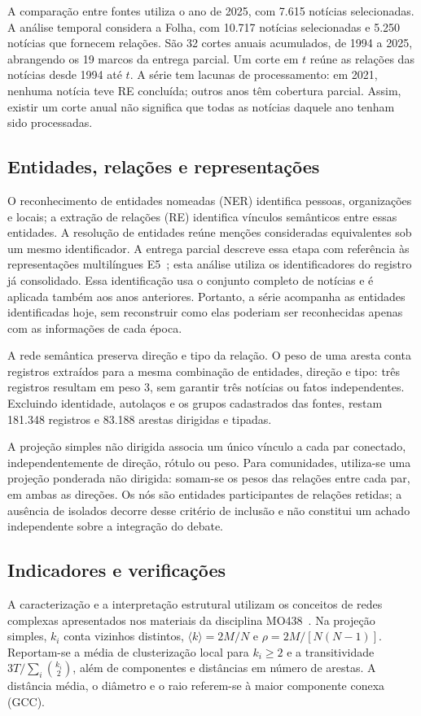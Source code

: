 \documentclass[11pt,a4paper]{article}
\begin{document}
A comparação entre fontes utiliza o ano de 2025, com 7.615 notícias selecionadas. A análise temporal considera a Folha, com 10.717 notícias selecionadas e 5.250 notícias que fornecem relações. São 32 cortes anuais acumulados, de 1994 a 2025, abrangendo os 19 marcos da entrega parcial. Um corte em $t$ reúne as relações das notícias desde 1994 até $t$. A série tem lacunas de processamento: em 2021, nenhuma notícia teve RE concluída; outros anos têm cobertura parcial. Assim, existir um corte anual não significa que todas as notícias daquele ano tenham sido processadas.

\subsection{Entidades, relações e representações}
O reconhecimento de entidades nomeadas (NER) identifica pessoas, organizações e locais; a extração de relações (RE) identifica vínculos semânticos entre essas entidades. A resolução de entidades reúne menções consideradas equivalentes sob um mesmo identificador. A entrega parcial descreve essa etapa com referência às representações multilíngues E5~\cite{wang2024e5}; esta análise utiliza os identificadores do registro já consolidado. Essa identificação usa o conjunto completo de notícias e é aplicada também aos anos anteriores. Portanto, a série acompanha as entidades identificadas hoje, sem reconstruir como elas poderiam ser reconhecidas apenas com as informações de cada época.

A rede semântica preserva direção e tipo da relação. O peso de uma aresta conta registros extraídos para a mesma combinação de entidades, direção e tipo: três registros resultam em peso 3, sem garantir três notícias ou fatos independentes. Excluindo identidade, autolaços e os grupos cadastrados das fontes, restam 181.348 registros e 83.188 arestas dirigidas e tipadas.

A projeção simples não dirigida associa um único vínculo a cada par conectado, independentemente de direção, rótulo ou peso. Para comunidades, utiliza-se uma projeção ponderada não dirigida: somam-se os pesos das relações entre cada par, em ambas as direções. Os nós são entidades participantes de relações retidas; a ausência de isolados decorre desse critério de inclusão e não constitui um achado independente sobre a integração do debate.

\subsection{Indicadores e verificações}
A caracterização e a interpretação estrutural utilizam os conceitos de redes complexas apresentados nos materiais da disciplina MO438~\cite{interian2026mo438}.
Na projeção simples, $k_i$ conta vizinhos distintos, $\langle k\rangle=2M/N$ e $\rho=2M/[N(N-1)]$. Reportam-se a média de clusterização local para $k_i\geq2$ e a transitividade $3T/\sum_i\binom{k_i}{2}$, além de componentes e distâncias em número de arestas. A distância média, o diâmetro e o raio referem-se à maior componente conexa (GCC).
\end{document}
